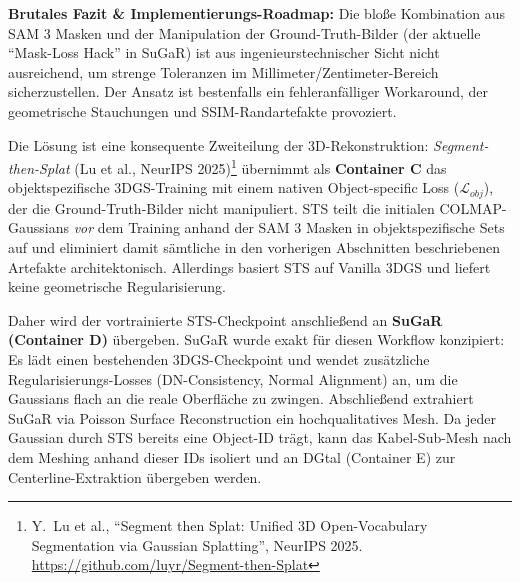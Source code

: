 \documentclass[12pt,a4paper]{article}
\begin{document}
\vspace{0.3cm}
\textbf{Brutales Fazit \& Implementierungs-Roadmap:}
Die bloße Kombination aus SAM 3 Masken und der Manipulation der Ground-Truth-Bilder (der aktuelle ``Mask-Loss Hack'' in SuGaR) ist aus ingenieurstechnischer Sicht nicht ausreichend, um strenge Toleranzen im Millimeter/Zentimeter-Bereich sicherzustellen. Der Ansatz ist bestenfalls ein fehleranfälliger Workaround, der geometrische Stauchungen und SSIM-Randartefakte provoziert.

Die Lösung ist eine konsequente Zweiteilung der 3D-Rekonstruktion: \textit{Segment-then-Splat} (Lu et al., NeurIPS 2025)\footnote{Y.~Lu et al., ``Segment then Splat: Unified 3D Open-Vocabulary Segmentation via Gaussian Splatting'', NeurIPS 2025. \url{https://github.com/luyr/Segment-then-Splat}} übernimmt als \textbf{Container C} das objektspezifische 3DGS-Training mit einem nativen Object-specific Loss ($\mathcal{L}_{obj}$), der die Ground-Truth-Bilder nicht manipuliert. STS teilt die initialen COLMAP-Gaussians \textit{vor} dem Training anhand der SAM 3 Masken in objektspezifische Sets auf und eliminiert damit sämtliche in den vorherigen Abschnitten beschriebenen Artefakte architektonisch. Allerdings basiert STS auf Vanilla 3DGS und liefert keine geometrische Regularisierung.

Daher wird der vortrainierte STS-Checkpoint anschließend an \textbf{SuGaR (Container D)} übergeben. SuGaR wurde exakt für diesen Workflow konzipiert: Es lädt einen bestehenden 3DGS-Checkpoint und wendet zusätzliche Regularisierungs-Losses (DN-Consistency, Normal Alignment) an, um die Gaussians flach an die reale Oberfläche zu zwingen. Abschließend extrahiert SuGaR via Poisson Surface Reconstruction ein hochqualitatives Mesh. Da jeder Gaussian durch STS bereits eine Object-ID trägt, kann das Kabel-Sub-Mesh nach dem Meshing anhand dieser IDs isoliert und an DGtal (Container E) zur Centerline-Extraktion übergeben werden.
\end{document}
